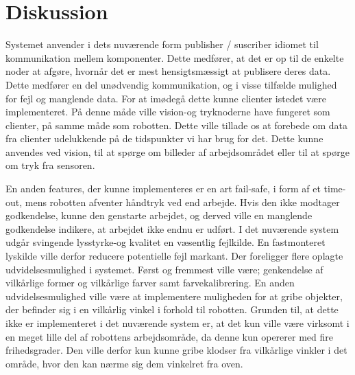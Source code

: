 \chapter{Diskussion}\label{chap:Diskussion}
Systemet anvender i dets nuværende form publisher / suscriber idiomet til kommunikation mellem komponenter. Dette medfører, at det er op til de enkelte noder at afgøre, hvornår det er mest hensigtsmæssigt at publisere deres data. Dette medfører en del unødvendig kommunikation, og i visse tilfælde mulighed for fejl og manglende data. 
For at imødegå dette kunne clienter istedet være implementeret. På denne måde ville vision-og tryknoderne have fungeret som clienter, på samme måde som robotten. Dette ville tillade os at forebede om data fra clienter udelukkende på de tidspunkter vi har brug for det. Dette kunne anvendes ved vision, til at spørge om billeder af arbejdsområdet eller til at spørge om tryk fra sensoren. 

En anden features, der kunne implementeres er en art fail-safe, i form af et time-out, mens robotten afventer håndtryk ved end arbejde. Hvis den ikke modtager godkendelse, kunne den genstarte arbejdet, og derved ville en manglende godkendelse indikere, at arbejdet ikke endnu er udført.
I det nuværende system udgår svingende lysstyrke-og kvalitet en væsentlig fejlkilde. En fastmonteret lyskilde ville derfor reducere potentielle fejl markant.
Der foreligger flere oplagte udvidelsesmulighed i systemet. Først og fremmest ville være; genkendelse af vilkårlige former og vilkårlige farver samt farvekalibrering.
En anden udvidelsesmulighed ville være at implementere muligheden for at gribe objekter, der befinder sig i en vilkårlig vinkel i forhold til robotten. Grunden til, at dette ikke er implementeret i det nuværende system er, at det kun ville være virksomt i en meget lille del af robottens arbejdsområde, da denne kun opererer med fire frihedsgrader. Den ville derfor kun kunne gribe klodser fra vilkårlige vinkler i det område, hvor den kan nærme sig dem vinkelret fra oven. 